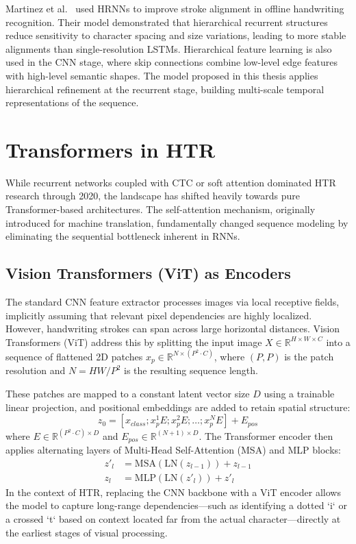 Martinez et al.~\cite{study2024hrnn} used HRNNs to improve stroke alignment in offline handwriting recognition. Their model demonstrated that hierarchical recurrent structures reduce sensitivity to character spacing and size variations, leading to more stable alignments than single-resolution LSTMs. Hierarchical feature learning is also used in the CNN stage, where skip connections combine low-level edge features with high-level semantic shapes. The model proposed in this thesis applies hierarchical refinement at the recurrent stage, building multi-scale temporal representations of the sequence.

\section{Transformers in HTR}
While recurrent networks coupled with CTC or soft attention dominated HTR research through 2020, the landscape has shifted heavily towards pure Transformer-based architectures. The self-attention mechanism, originally introduced for machine translation, fundamentally changed sequence modeling by eliminating the sequential bottleneck inherent in RNNs.

\subsection{Vision Transformers (ViT) as Encoders}
The standard CNN feature extractor processes images via local receptive fields, implicitly assuming that relevant pixel dependencies are highly localized. However, handwriting strokes can span across large horizontal distances. Vision Transformers (ViT) address this by splitting the input image $X \in \mathbb{R}^{H \times W \times C}$ into a sequence of flattened 2D patches $x_p \in \mathbb{R}^{N \times (P^2 \cdot C)}$, where $(P, P)$ is the patch resolution and $N = HW / P^2$ is the resulting sequence length. 

These patches are mapped to a constant latent vector size $D$ using a trainable linear projection, and positional embeddings are added to retain spatial structure:
\begin{equation}
    z_0 = [x_{class}; x_p^1 E; x_p^2 E; \dots; x_p^N E] + E_{pos}
\end{equation}
where $E \in \mathbb{R}^{(P^2 \cdot C) \times D}$ and $E_{pos} \in \mathbb{R}^{(N+1) \times D}$. The Transformer encoder then applies alternating layers of Multi-Head Self-Attention (MSA) and MLP blocks:
\begin{align}
    z'_l &= \text{MSA}(\text{LN}(z_{l-1})) + z_{l-1} \\
    z_l &= \text{MLP}(\text{LN}(z'_l)) + z'_l
\end{align}
In the context of HTR, replacing the CNN backbone with a ViT encoder allows the model to capture long-range dependencies—such as identifying a dotted `i` or a crossed `t` based on context located far from the actual character—directly at the earliest stages of visual processing.

